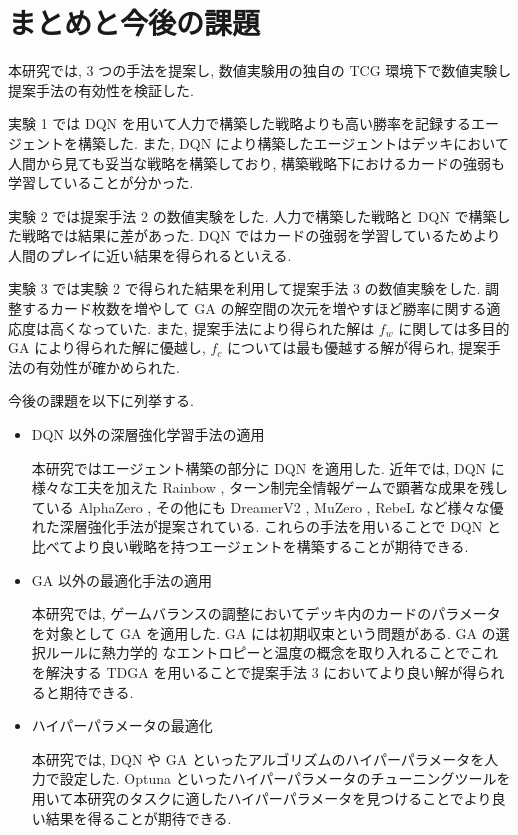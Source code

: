 \newpage
\changeindent{0cm}
\section{まとめと今後の課題}

本研究では, 3 つの手法を提案し, 数値実験用の独自の TCG 環境下で数値実験し提案手法の有効性を検証した.
\par
実験 1 では DQN を用いて人力で構築した戦略よりも高い勝率を記録するエージェントを構築した. また, DQN により構築したエージェントはデッキにおいて人間から見ても妥当な戦略を構築しており, 構築戦略下におけるカードの強弱も学習していることが分かった.
\par
実験 2 では提案手法 2 の数値実験をした. 人力で構築した戦略と DQN で構築した戦略では結果に差があった. DQN ではカードの強弱を学習しているためより人間のプレイに近い結果を得られるといえる.
\par
実験 3 では実験 2 で得られた結果を利用して提案手法 3 の数値実験をした. 調整するカード枚数を増やして GA の解空間の次元を増やすほど勝率に関する適応度は高くなっていた. 
また, 提案手法により得られた解は $f_w$ に関しては多目的 GA により得られた解に優越し, $f_c$ については最も優越する解が得られ, 提案手法の有効性が確かめられた.\par
今後の課題を以下に列挙する.
\begin{itemize}
  \small
  \setlength{\itemsep}{0cm} %
  \item DQN 以外の深層強化学習手法の適用
  \par
  本研究ではエージェント構築の部分に DQN を適用した. 近年では, DQN に様々な工夫を加えた Rainbow \cite{Rainbow}, ターン制完全情報ゲームで顕著な成果を残している AlphaZero \cite{AlphaZero}, その他にも DreamerV2  \cite{DreamerV2}, MuZero \cite{MuZero}, RebeL \cite{ReBeL} など様々な優れた深層強化手法が提案されている. これらの手法を用いることで DQN と比べてより良い戦略を持つエージェントを構築することが期待できる.
  \item GA 以外の最適化手法の適用\par
  本研究では, ゲームバランスの調整においてデッキ内のカードのパラメータを対象として GA を適用した. GA には初期収束という問題がある. GA の選択ルールに熱力学的
  なエントロピーと温度の概念を取り入れることでこれを解決する TDGA \cite{TDGA} を用いることで提案手法 3 においてより良い解が得られると期待できる.
  \item ハイパーパラメータの最適化
  \par
  本研究では, DQN や GA といったアルゴリズムのハイパーパラメータを人力で設定した. Optuna \cite{Optuna} といったハイパーパラメータのチューニングツールを用いて本研究のタスクに適したハイパーパラメータを見つけることでより良い結果を得ることが期待できる.
\end{itemize}




\changeindent{2cm}